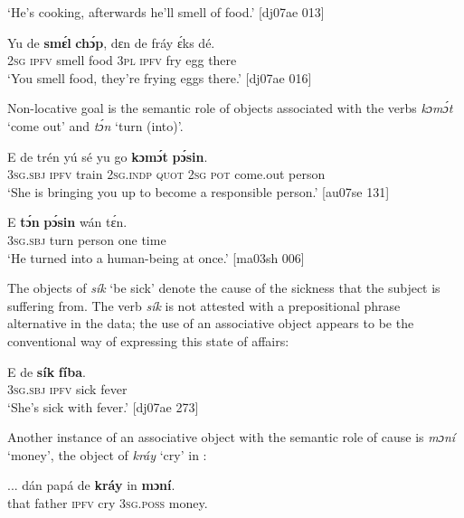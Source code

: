 \glt ‘He’s cooking, afterwards he’ll smell of food.’ [dj07ae 013]
\z


\ea%
    \label{ex:key:1186}
    \gll Yu  de  \textbf{smɛ́l}  \textbf{chɔ́p},  dɛn  de  fráy  ɛ́ks  dé.\\
\textsc{2sg}  \textsc{ipfv}  smell  food    \textsc{3pl}  \textsc{ipfv}  fry  egg  there\\

\glt ‘You smell food, they’re frying eggs there.’ [dj07ae 016]
\z

Non-locative goal is the semantic role of objects associated with the verbs \textit{kɔmɔ́t} ‘come out’ and \textit{tɔ́n} ‘turn (into)’. 


\ea%
    \label{ex:key:1187}
    \gll E    de  trén    yú    sé    yu  go  \textbf{kɔmɔ́t}    \textbf{pɔ́sin}.\\
\textsc{3sg.sbj}  \textsc{ipfv}  train  \textsc{2sg.indp}  \textsc{quot}    \textsc{2sg}  \textsc{pot}  come.out  person\\

\glt ‘She is bringing you up to become a responsible person.’ [au07se 131]
\z


\ea%
    \label{ex:key:1188}
    \gll E    \textbf{tɔ́n}    \textbf{pɔ́sin}  wán    tɛ́n.\\
\textsc{3sg.sbj}  turn    person  one    time\\

\glt ‘He turned into a human-being at once.’ [ma03sh 006]
\z

The objects of \textit{sík} ‘be sick’ denote the cause of the sickness that the subject is suffering from. The verb \textit{sík} is not attested with a prepositional phrase alternative in the data; the use of an associative object appears to be the conventional way of expressing this state of affairs: 


\ea%
    \label{ex:key:1189}
    \gll E    de  \textbf{sík}  \textbf{fíba}.\\
\textsc{3sg.sbj}  \textsc{ipfv}  sick  fever\\

\glt ‘She’s sick with fever.’ [dj07ae 273]
\z

Another instance of an associative object with the semantic role of cause is \textit{mɔní} ‘money’, the object of \textit{kráy} ‘cry’ in :


\ea%
    \label{ex:key:1190}
    \gll \op...\cp{}  dán  papá  de  \textbf{kráy}  in    \textbf{mɔní}.\\
  {} that  father  \textsc{ipfv}  cry    \textsc{3sg.poss}  money.\\

